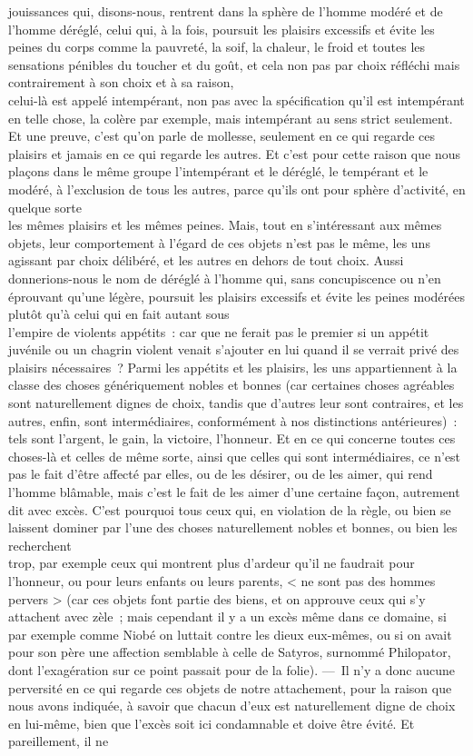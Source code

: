 \documentclass[french,twoside]{book} %
\begin{document}
jouissances qui, disons-nous, rentrent dans la sphère de l’homme modéré et de l’homme déréglé, celui qui, à la fois, poursuit les plaisirs excessifs et évite les peines du corps comme la pauvreté, la soif, la chaleur, le froid et toutes les sensations pénibles du toucher et du goût, et cela non pas par choix réfléchi mais contrairement à son choix et à sa raison, \\
celui-là est appelé intempérant, non pas avec la spécification qu’il est intempérant en telle chose, la colère par exemple, mais intempérant au sens strict seulement. Et une preuve, c’est qu’on parle de mollesse, seulement en ce qui regarde ces plaisirs et jamais en ce qui regarde les autres. Et c’est pour cette raison que nous plaçons dans le même groupe l’intempérant et le déréglé, le tempérant et le modéré, à l’exclusion de tous les autres, parce qu’ils ont pour sphère d’activité, en quelque sorte \\
les mêmes plaisirs et les mêmes peines. Mais, tout en s’intéressant aux mêmes objets, leur comportement à l’égard de ces objets n’est pas le même, les uns agissant par choix délibéré, et les autres en dehors de tout choix. Aussi donnerions-nous le nom de déréglé à l’homme qui, sans concupiscence ou n’en éprouvant qu’une légère, poursuit les plaisirs excessifs et évite les peines modérées plutôt qu’à celui qui en fait autant sous \\
l’empire de violents appétits : car que ne ferait pas le premier si un appétit juvénile ou un chagrin violent venait s’ajouter en lui quand il se verrait privé des plaisirs nécessaires ? Parmi les appétits et les plaisirs, les uns appartiennent à la classe des choses génériquement nobles et bonnes (car certaines choses agréables sont naturellement dignes de choix, tandis que d’autres leur sont contraires, et les autres, enfin, sont intermédiaires, conformément à nos distinctions antérieures) : \\
tels sont l’argent, le gain, la victoire, l’honneur. Et en ce qui concerne toutes ces choses-là et celles de même sorte, ainsi que celles qui sont intermédiaires, ce n’est pas le fait d’être affecté par elles, ou de les désirer, ou de les aimer, qui rend l’homme blâmable, mais c’est le fait de les aimer d’une certaine façon, autrement dit avec excès. C’est pourquoi tous ceux qui, en violation de la règle, ou bien se laissent dominer par l’une des choses naturellement nobles et bonnes, ou bien les recherchent \\
trop, par exemple ceux qui montrent plus d’ardeur qu’il ne faudrait pour l’honneur, ou pour leurs enfants ou leurs parents, < ne sont pas des hommes pervers > (car ces objets font partie des biens, et on approuve ceux qui s’y attachent avec zèle ; mais cependant il y a un excès même dans ce domaine, si par exemple comme Niobé on luttait contre les dieux eux-mêmes, ou si on avait pour son père une affection semblable à celle  de Satyros, surnommé Philopator, dont l’exagération sur ce point passait pour de la folie). — Il n’y a donc aucune perversité en ce qui regarde ces objets de notre attachement, pour la raison que nous avons indiquée, à savoir que chacun d’eux est naturellement digne de choix en lui-même, bien que l’excès soit ici condamnable et doive être évité. Et pareillement, il ne \\
\end{document}
